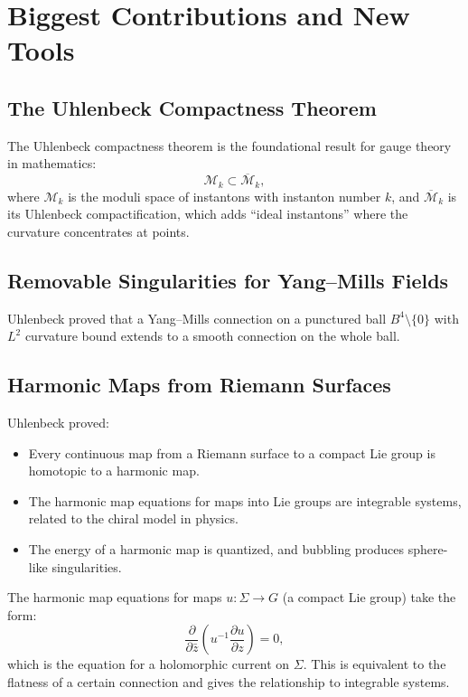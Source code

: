 \section{Biggest Contributions and New Tools}

\subsection{The Uhlenbeck Compactness Theorem}

The Uhlenbeck compactness theorem is the foundational result for gauge theory in mathematics:
\[
\mathcal{M}_k \subset \overline{\mathcal{M}}_k,
\]
where $\mathcal{M}_k$ is the moduli space of instantons with instanton number $k$, and $\overline{\mathcal{M}}_k$ is its Uhlenbeck compactification, which adds ``ideal instantons'' where the curvature concentrates at points.

\subsection{Removable Singularities for Yang--Mills Fields}

Uhlenbeck proved that a Yang--Mills connection on a punctured ball $B^4 \setminus \{0\}$ with $L^2$ curvature bound extends to a smooth connection on the whole ball.

\subsection{Harmonic Maps from Riemann Surfaces}

Uhlenbeck proved:
\begin{itemize}
\item Every continuous map from a Riemann surface to a compact Lie group is homotopic to a harmonic map.
\item The harmonic map equations for maps into Lie groups are integrable systems, related to the chiral model in physics.
\item The energy of a harmonic map is quantized, and bubbling produces sphere-like singularities.
\end{itemize}

The harmonic map equations for maps $u: \Sigma \to G$ (a compact Lie group) take the form:
\[
\frac{\partial}{\partial \bar{z}} \left(u^{-1} \frac{\partial u}{\partial z}\right) = 0,
\]
which is the equation for a holomorphic current on $\Sigma$. This is equivalent to the flatness of a certain connection and gives the relationship to integrable systems.

